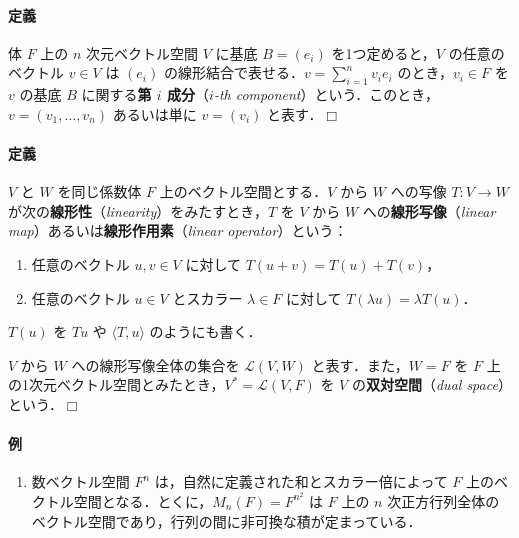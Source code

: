 \documentclass[b5paper,pandoc]{bxjsarticle}
\providecommand{\tightlist}{%
  \setlength{\itemsep}{0pt}\setlength{\parskip}{0pt}}
\let\oldparagraph\paragraph
\renewcommand{\paragraph}[1]{\oldparagraph{#1}\mbox{}}
\begin{document}
\hypertarget{components-of-vector-in-finite-dimensional-space}{%
\paragraph{定義}\label{components-of-vector-in-finite-dimensional-space}}

体 \(F\) 上の \(n\) 次元ベクトル空間 \(V\) に基底 \(B = (e_i)\)
を1つ定めると，\(V\) の任意のベクトル \(v \in V\) は \((e_i)\)
の線形結合で表せる．\(v = \sum_{i = 1}^n v_i e_i\) のとき，\(v_i \in F\)
を \(v\) の基底 \(B\) に関する\textbf{第 \(i\) 成分}（\emph{\(i\)-th
component}）という．このとき，\(v = (v_1, \dotsc, v_n)\) あるいは単に
\(v = (v_i)\) と表す．\(\Box\)

\hypertarget{linear-map}{%
\paragraph{定義}\label{linear-map}}

\(V\) と \(W\) を同じ係数体 \(F\) 上のベクトル空間とする．\(V\) から
\(W\) への写像 \(T \colon V \to W\)
が次の\textbf{線形性}（\emph{linearity}）をみたすとき，\(T\) を \(V\)
から \(W\) への\textbf{線形写像}（\emph{linear
map}）あるいは\textbf{線形作用素}（\emph{linear operator}）という：

\begin{enumerate}
\def\labelenumi{\arabic{enumi}.}
\tightlist
\item
  任意のベクトル \(u, v \in V\) に対して \(T(u + v) = T(u) + T(v)\)，
\item
  任意のベクトル \(u \in V\) とスカラー \(\lambda \in F\) に対して
  \(T(\lambda u) = \lambda T(u)\)．
\end{enumerate}

\(T(u)\) を \(Tu\) や \(\langle T, u \rangle\) のようにも書く．

\(V\) から \(W\) への線形写像全体の集合を \(\mathcal L(V, W)\)
と表す．また，\(W = F\) を \(F\)
上の1次元ベクトル空間とみたとき，\(V^* = \mathcal L(V, F)\) を \(V\)
の\textbf{双対空間}（\emph{dual space}）という．\(\Box\)

\hypertarget{ux4f8b}{%
\paragraph{例}\label{ux4f8b}}

\begin{enumerate}
\def\labelenumi{\roman{enumi})}
\tightlist
\item
  数ベクトル空間 \(F^n\) は，自然に定義された和とスカラー倍によって
  \(F\) 上のベクトル空間となる．とくに，\(M_n(F) = F^{n^2}\) は \(F\)
  上の \(n\)
  次正方行列全体のベクトル空間であり，行列の間に非可換な積が定まっている．
\end{enumerate}
\end{document}
